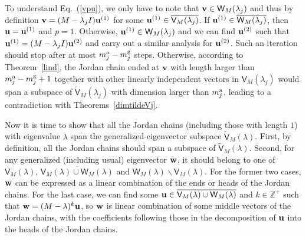 \documentclass{tADP2e}
\theoremstyle{plain}
\theoremstyle{plain}
\theoremstyle{definition}
\begin{document}
\begin{appendices}
To understand Eq.~(\ref{vpu}), we only have to note that $\bold{v}\in \textsf{W}_M(\lambda_j)$ and thus by definition $\bold{v}=(M-\lambda_jI)\bold{u}^{(1)}$ for some $\bold{u}^{(1)}\in\overline{\textsf{V}_M(\lambda_j)}$. If $\bold{u}^{(1)}\in\overline{\textsf{W}_M(\lambda_j)}$, then $\bold{u}=\bold{u}^{(1)}$ and $p=1$. Otherwise, $\bold{u}^{(1)}\in \textsf{W}_M(\lambda_j)$ and we can find $\bold{u}^{(2)}$ such that $\bold{u}^{(1)}=(M-\lambda_j I)\bold{u}^{(2)}$ and carry out a similar analysis for $\bold{u}^{(2)}$. Such an iteration should stop after at most $m^{\rm a}_j-m^{\rm g}_j$ steps. Otherwise, according to Theorem~\ref{lind}, the Jordan chain ended at $\bold{v}$ with length larger than $m^{\rm a}_j-m^{\rm g}_j+1$ together with other linearly independent vectors in $\textsf{V}_M(\lambda_j)$ would span a subspace of $\tilde{\textsf{V}}_M(\lambda_j)$ with dimension larger than $m^{\rm a}_j$, leading to a contradiction with Theorems~\ref{dimtildeVj}. 

Now it is time to show that all the Jordan chains (including those with length $1$) with eigenvalue $\lambda$ span the generalized-eigenvector subspace $\tilde{\textsf{V}}_M(\lambda)$. First, by definition, all the Jordan chains should span a subspace of $\tilde{\textsf{V}}_M(\lambda)$. Second, for any generalized (including usual) eigenvector $\bold{w}$, it should belong to one of $\textsf{V}_M(\lambda)$, $\overline{\textsf{V}_M(\lambda)\cup \textsf{W}_M(\lambda)}$ and $\textsf{W}_M(\lambda)\backslash \textsf{V}_M(\lambda)$. For the former two cases, $\bold{w}$ can be expressed as a linear combination of the ends or heads of the Jordan chains. For the last case, we can find some $\bold{u}\in \overline{\textsf{V}_M(\lambda)\cup \textsf{W}_M(\lambda)}$ and $k\in\mathbb{Z}^+$ such that $\bold{w}=(M-\lambda)^k\bold{u}$, so $\bold{w}$ is linear combination of some middle vectors of the Jordan chains, with the coefficients following those in the decomposition of $\bold{u}$ into the heads of the Jordan chains.


\end{appendices}
\end{document}
